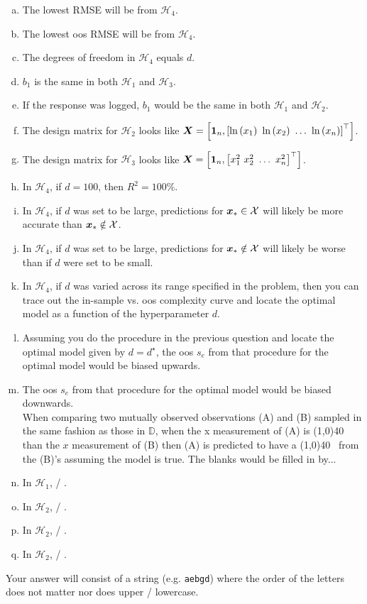 \documentclass[12pt]{article}
\newcommand{\instr}{\small Your answer will consist of a string (e.g. \texttt{aebgd}) where the order of the letters does not matter nor does upper / lowercase. \normalsize}
\begin{document}
\begin{enumerate}[(a)]
\item The lowest RMSE will be from $\mathcal{H}_4$.
\item The lowest oos RMSE will be from $\mathcal{H}_4$.
\item The degrees of freedom in $\mathcal{H}_4$ equals $d$.
\item $b_1$ is the same in both $\mathcal{H}_1$ and $\mathcal{H}_3$.
\item If the response was logged, $b_1$ would be the same in both $\mathcal{H}_1$ and $\mathcal{H}_2$.
\item The design matrix for $\mathcal{H}_2$ looks like $\boldsymbol{X} = \left[\boldsymbol{1}_n, \left[\ln\left(x_1\right)~\ln\left(x_2\right) ~ \ldots ~ \ln\left(x_n\right)\right]^\top\right]$.
\item The design matrix for $\mathcal{H}_3$ looks like $\boldsymbol{X} = \left[\boldsymbol{1}_n, \left[x_1^2~x_2^2 ~ \ldots ~ x_n^2\right]^\top\right]$.
\item In $\mathcal{H}_4$, if $d = 100$, then $R^2 = 100\%$.
\item In $\mathcal{H}_4$, if $d$ was set to be large, predictions for $\boldsymbol{x}_* \in \mathcal{X}$ will likely be more accurate than $\boldsymbol{x}_* \notin \mathcal{X}$.
\item In $\mathcal{H}_4$, if $d$ was set to be large, predictions for $\boldsymbol{x}_* \notin \mathcal{X}$ will likely be worse than if $d$ were set to be small.
\item In $\mathcal{H}_4$, if $d$ was varied across its range specified in the problem, then you can trace out the in-sample vs. oos complexity curve and locate the optimal model as a function of the hyperparameter $d$.
\item Assuming you do the procedure in the previous question and locate the optimal model given by $d = d^\star$, the oos $s_e$ from that procedure for the optimal model would be biased upwards.
\item The oos $s_e$ from that procedure for the optimal model would be biased downwards.\\

When comparing two mutually observed observations (A) and (B) sampled in the same fashion as those in $\mathbb{D}$, when the x measurement of (A) is \line(1,0){40}~ than the $x$ measurement of (B) then (A) is predicted to have a \line(1,0){40}~ from the (B)'s assuming the model is true. The blanks would be filled in by...

\item In $\mathcal{H}_1$,  / .

\item In $\mathcal{H}_2$,  / .
\item In $\mathcal{H}_2$,  / .
\item In $\mathcal{H}_2$,  / .
\end{enumerate}
\eenum\instr\pagebreak
\end{document}
